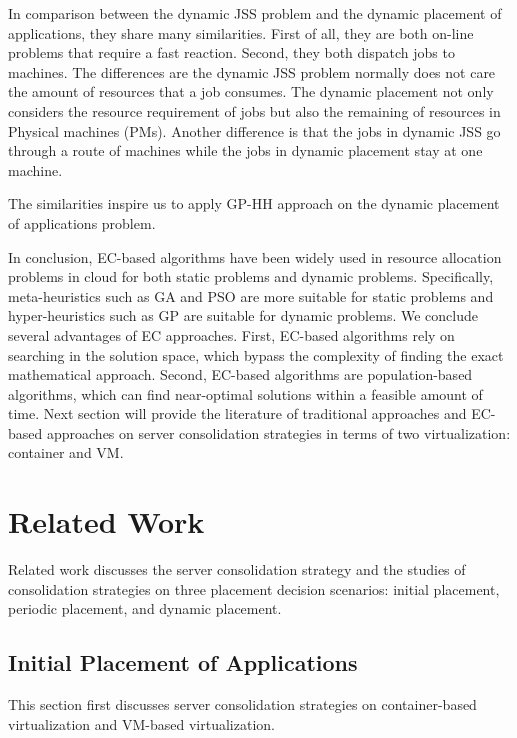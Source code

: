 In comparison between the dynamic JSS problem and the dynamic placement of applications, they share many similarities. First of all, they are both on-line problems that require a fast reaction. Second, they both dispatch jobs to machines. The differences are the dynamic JSS problem normally does not care the amount of resources that a job consumes. The dynamic placement not only considers the resource requirement of jobs but also the remaining of resources in Physical machines (PMs). Another difference is that the jobs in dynamic JSS go through a route of machines while the jobs in dynamic placement stay at one machine.

The similarities inspire us to apply GP-HH approach on the dynamic placement of applications problem.

\vspace{5mm}


In conclusion, EC-based algorithms have been widely used in resource allocation problems in cloud for both static problems and dynamic problems. Specifically, meta-heuristics such as GA and PSO are more suitable for static problems and hyper-heuristics such as GP are suitable for dynamic problems. 
We conclude several advantages of EC approaches. First, EC-based algorithms rely on searching in the solution space, which bypass the complexity of finding the exact mathematical approach. Second, EC-based algorithms are population-based algorithms, which can find near-optimal solutions within a feasible amount of time.
Next section will provide the literature of traditional approaches and EC-based approaches on server consolidation strategies in terms of two virtualization: container and VM. 


\section{Related Work}
\label{sec:related_work}
Related work discusses the server consolidation strategy and the studies of consolidation strategies on three placement decision scenarios: initial placement, periodic placement, and dynamic placement. 


\subsection{Initial Placement of Applications}
\label{sec:initial}

This section first discusses server consolidation strategies on container-based virtualization and VM-based virtualization.

